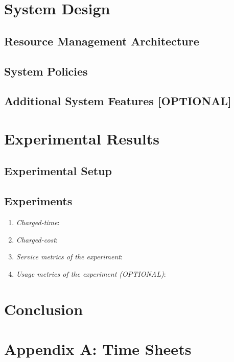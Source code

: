 \documentclass[a4paper, sigconf, twocolumn]{acmart}
\begin{document}
\section{System Design}

\subsection{Resource Management Architecture}

\subsection{System Policies}

\subsection{Additional System Features [OPTIONAL]}

\section{Experimental Results}

\subsection{Experimental Setup}

\subsection{Experiments}

\begin{enumerate}
  \item{\emph{Charged-time}: }
  \item{\emph{Charged-cost}: }
  \item{\emph{Service metrics of the experiment}: }
  \item{\emph{Usage metrics of the experiment (OPTIONAL)}: }
\end{enumerate}

\section{Conclusion}




\section*{Appendix A: Time Sheets}
\end{document}
